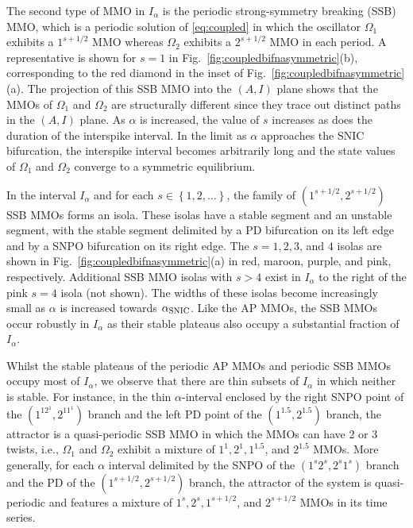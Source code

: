 \documentclass[10pt,onecolumn]{article}
\theoremstyle{plain}
\begin{document}
The second type of MMO in $I_{\alpha}$ is the periodic strong-symmetry breaking (SSB) MMO, which is a periodic solution of \eqref{eq:coupled} in which the oscillator $\Omega_1$ exhibits a $1^{s+1/2}$ MMO whereas $\Omega_2$ exhibits a $2^{s+1/2}$ MMO in each period. 
A representative is shown for $s=1$ in Fig.~\ref{fig:coupledbifnasymmetric}(b), corresponding to the red diamond in the inset of Fig.~\ref{fig:coupledbifnasymmetric}(a). 
The projection of this SSB MMO into the $(A,I)$ plane shows that the MMOs of $\Omega_1$ and $\Omega_2$ are structurally different since they trace out distinct paths in the $(A,I)$ plane.
As $\alpha$ is increased, the value of $s$ increases as does the duration of the interspike interval. 
In the limit as $\alpha$ approaches the SNIC bifurcation, the interspike interval becomes arbitrarily long and the state values of $\Omega_1$ and $\Omega_2$ converge to a symmetric equilibrium. 

In the interval $I_{\alpha}$ and for each $s \in \left\{ 1,2,\ldots \right\}$, the family of $(1^{s+1/2},2^{s+1/2})$ SSB MMOs forms an isola. 
These isolas have a stable segment and an unstable segment, with the stable segment delimited by a PD bifurcation on its left edge and by a SNPO bifurcation on its right edge. 
The $s=1,2,3$, and $4$ isolas are shown in Fig.~\ref{fig:coupledbifnasymmetric}(a) in red, maroon, purple, and pink, respectively. 
Additional SSB MMO isolas with $s>4$ exist in $I_{\alpha}$ to the right of the pink $s=4$ isola (not shown). 
The widths of these isolas become increasingly small as $\alpha$ is increased towards $\alpha_{\rm SNIC}$. 
Like the AP MMOs, the SSB MMOs occur robustly in $I_{\alpha}$ as their stable plateaus also occupy a substantial fraction of $I_{\alpha}$. 

Whilst the stable plateaus of the periodic AP MMOs and periodic SSB MMOs occupy most of $I_{\alpha}$, we observe that there are thin subsets of $I_{\alpha}$ in which neither is stable. 
For instance, in the thin $\alpha$-interval enclosed by the right SNPO point of the $(1^12^1,2^11^1)$ branch and the left PD point of the $(1^{1.5},2^{1.5})$ branch, the attractor is a quasi-periodic SSB MMO in which the MMOs can have 2 or 3 twists, i.e., $\Omega_1$ and $\Omega_2$ exhibit a mixture of $1^1, 2^1, 1^{1.5}$, and $2^{1.5}$ MMOs.
More generally, for each $\alpha$ interval delimited by the SNPO of the $(1^s2^s,2^s1^s)$ branch and the PD of the $(1^{s+1/2},2^{s+1/2})$ branch, the attractor of the system is quasi-periodic and features a mixture of $1^s, 2^s, 1^{s+1/2}$, and $2^{s+1/2}$ MMOs in its time series. 
\end{document}
